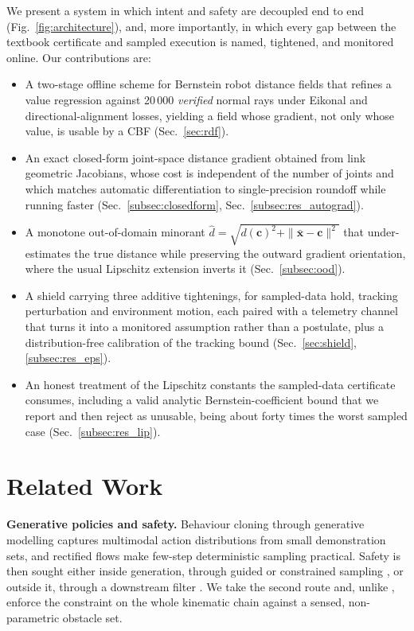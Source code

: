 \documentclass[journal]{IEEEtran}
\begin{document}
We present a system in which intent and safety are decoupled end to end (Fig.~\ref{fig:architecture}), and, more importantly, in which every gap between the textbook certificate and sampled execution is named, tightened, and monitored online. Our contributions are:

\begin{itemize}
\item A two-stage offline scheme for Bernstein robot distance fields that refines a value regression against 20\,000 \emph{verified} normal rays under Eikonal and directional-alignment losses, yielding a field whose gradient, not only whose value, is usable by a CBF (Sec.~\ref{sec:rdf}).
\item An exact closed-form joint-space distance gradient obtained from link geometric Jacobians, whose cost is independent of the number of joints and which matches automatic differentiation to single-precision roundoff while running faster (Sec.~\ref{subsec:closedform}, Sec.~\ref{subsec:res_autograd}).
\item A monotone out-of-domain minorant $\hat d=\sqrt{d(\mathbf{c})^2+\|\bar{\mathbf{x}}-\mathbf{c}\|^2}$ that under-estimates the true distance while preserving the outward gradient orientation, where the usual Lipschitz extension inverts it (Sec.~\ref{subsec:ood}).
\item A shield carrying three additive tightenings, for sampled-data hold, tracking perturbation and environment motion, each paired with a telemetry channel that turns it into a monitored assumption rather than a postulate, plus a distribution-free calibration of the tracking bound (Sec.~\ref{sec:shield}, \ref{subsec:res_eps}).
\item An honest treatment of the Lipschitz constants the sampled-data certificate consumes, including a valid analytic Bernstein-coefficient bound that we report and then reject as unusable, being about forty times the worst sampled case (Sec.~\ref{subsec:res_lip}).
\end{itemize}

\section{Related Work}

\textbf{Generative policies and safety.} Behaviour cloning through generative modelling \cite{ChiXXXXVisuomotor} captures multimodal action distributions from small demonstration sets, and rectified flows \cite{Lipman2023Flow,Liu2023Rectified} make few-step deterministic sampling practical. Safety is then sought either inside generation, through guided or constrained sampling \cite{Dai2025Safeflow}, or outside it, through a downstream filter \cite{Rmer2026From,Wabersich2021Predictive}. We take the second route and, unlike \cite{Rmer2026From}, enforce the constraint on the whole kinematic chain against a sensed, non-parametric obstacle set.
\end{document}
